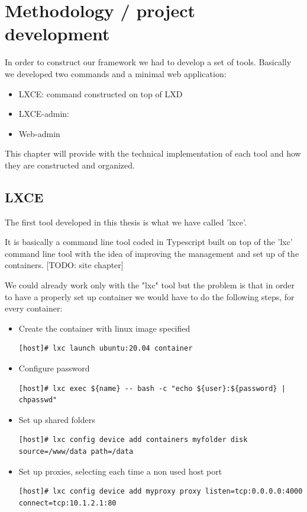 \clearpage\section{Methodology / project development}

In order to construct our framework we had to develop a set of tools. Basically we developed two commands and a minimal web application:
\begin{itemize}
	\item{LXCE: command constructed on top of LXD}
	\item{LXCE-admin: }
	\item{Web-admin} 
\end{itemize}

This chapter will provide with the technical implementation of each tool and how they are constructed and organized. 

\subsection{LXCE}
The first tool developed in this thesis is what we have called 'lxce'.

It is basically a command line tool coded in Typescript built on top of the 'lxc' command line tool with the idea of improving the management and set up of the containers.
[TODO: site chapter]

We could already work only with the "lxc" tool but the problem is that in order to have a properly set up container we would have to do the following steps, for every container:
\begin{itemize}
	\item{Create the container with linux image specified}
		\begin{verbatim}
[host]# lxc launch ubuntu:20.04 container
		\end{verbatim}
	\item{Configure password}
		\begin{verbatim}
[host]# lxc exec ${name} -- bash -c "echo ${user}:${password} | chpasswd"
		\end{verbatim}
	\item{Set up shared folders}
		\begin{verbatim}
[host]# lxc config device add containers myfolder disk source=/www/data path=/data
		\end{verbatim}
	\item{Set up proxies, selecting each time a non used host port}
		\begin{verbatim}
[host]# lxc config device add myproxy proxy listen=tcp:0.0.0.0:4000 connect=tcp:10.1.2.1:80
		\end{verbatim}
\end{itemize}

